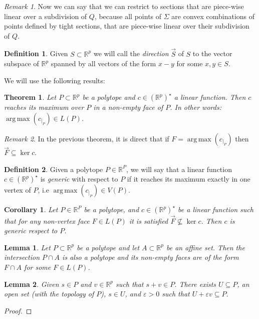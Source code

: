 \documentclass[10pt,a4paper]{article}
\DeclareMathOperator*{\argmax}{arg\,max}
\newcommand{\RR}{\mathbb{R}}
\newcommand{\eps}{\varepsilon}
\theoremstyle{plain}
\newtheorem{theorem}{Theorem}
\newtheorem{lemma}{Lemma}
\newtheorem{corollary}{Corollary}
\theoremstyle{remark}
\newtheorem{remark}{Remark}
\theoremstyle{definition}
\newtheorem{definition}{Definition}
\begin{document}
\begin{remark}
	Now we can say that we can restrict to sections
	that are  piece-wise linear over a subdivision of $Q$,
	because all points of $\Sigma$ are convex combinations
	of points defined by tight sections, 
	that are piece-wise linear over their subdivision of $Q$.
\end{remark}

\begin{definition} 
	Given $S\subset \RR^p$ we will call the \emph{direction}
	$\overrightarrow{S}$ of $S$ to the vector subspace of $\RR^p$ 
	spanned by all vectors of the form $x-y$ for some $x,y\in S$. 
\end{definition}

We will use the following results:

\begin{theorem} 
	\label{thm:maxLinearInPolytope}
	Let $P \subset \RR^p$ be a polytope and $c\in (\RR^ p)^\star$ a linear function. 
	Then $c$ reaches its maximum over $P$ in a non-empty face of $P$. 
	In other words: $\argmax(c_{|_P})\in L(P)$.
\end{theorem}

\begin{remark} In the previous theorem, it is direct that if $F=\argmax(c_{|_P})$ 
	then $\overrightarrow{F}\subseteq \ker c$.
\end{remark}

\begin{definition}
	Given a polytope $P\in \RR^P$, we will say that a linear function $c\in (\RR^p)^\star$ 
	is  \emph{generic} with respect to $P$ if it reaches its maximum exactly in one vertex of $P$, i.e $\argmax(c_{|_P})\in V(P)$.
\end{definition}


\begin{corollary} Let $P\in \RR^P$ be a polytope, and $c\in (\RR^p)^\star$ be a linear function such that for any non-vertex face $F\in L(P)$ it is satisfied $\overrightarrow{F}\nsubseteq \ker c$. Then $c$ is generic respect to $P$.
\end{corollary}

\begin{lemma} 
	Let $P \subset \RR^p$ be a polytope and let $A \subset \RR^p$ be an affine set.
	Then the intersection $P \cap A$ is also a polytope 
	and its non-empty faces are of the form $F\cap A$ for some $F\in L(P)$.
\end{lemma}

\begin{lemma}
	\label{lem:lemilla}
	Given $s\in  {P}$ and $v\in\RR^p$ such that $s+v\in   P$.
	There exists $U\subseteq   P$, 
	an open set (with the topology of $  P$), $s\in U$,
	and $\eps > 0$ such that $U+\eps v \subseteq   P$.
\end{lemma}
\begin{proof}
\end{proof}
\end{document}
